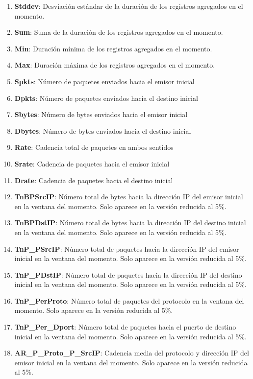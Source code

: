 \begin{enumerate}
    \item \textbf{Stddev}: Desviación estándar de la duración de los registros agregados en el momento.
    \item \textbf{Sum}: Suma de la duración de los registros agregados en el momento.
    \item \textbf{Min}: Duración mínima de los registros agregados en el momento.
    \item \textbf{Max}: Duración máxima de los registros agregados en el momento.
    \item \textbf{Spkts}: Número de paquetes enviados hacia el emisor inicial
    \item \textbf{Dpkts}: Número de paquetes enviados hacia el destino inicial
    \item \textbf{Sbytes}: Número de bytes enviados hacia el emisor inicial
    \item \textbf{Dbytes}: Número de bytes enviados hacia el destino inicial
    \item \textbf{Rate}: Cadencia total de paquetes en ambos sentidos
    \item \textbf{Srate}: Cadencia de paquetes hacia el emisor inicial
    \item \textbf{Drate}: Cadencia de paquetes hacia el destino inicial
    \item \textbf{TnBPSrcIP}: Número total de bytes hacia la dirección IP del emisor inicial en la ventana del momento. Solo aparece en la versión reducida al 5\%.
    \item \textbf{TnBPDstIP}: Número total de bytes hacia la dirección IP del destino inicial en la ventana del momento. Solo aparece en la versión reducida al 5\%.
    \item \textbf{TnP\_PSrcIP}: Número total de paquetes hacia la dirección IP del emisor inicial en la ventana del momento. Solo aparece en la versión reducida al 5\%.
    \item \textbf{TnP\_PDstIP}: Número total de paquetes hacia la dirección IP del destino inicial en la ventana del momento. Solo aparece en la versión reducida al 5\%.
    \item \textbf{TnP\_PerProto}: Número total de paquetes del protocolo en la ventana del momento. Solo aparece en la versión reducida al 5\%.
    \item \textbf{TnP\_Per\_Dport}: Número total de paquetes hacia el puerto de destino inicial en la ventana del momento. Solo aparece en la versión reducida al 5\%.
    \item \textbf{AR\_P\_Proto\_P\_SrcIP}: Cadencia media del protocolo y dirección IP del emisor inicial en la ventana del momento. Solo aparece en la versión reducida al 5\%.

\end{enumerate}
